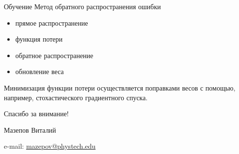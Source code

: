 \documentclass[unicode,aspectratio=43]{beamer}
\newcommand{\colorhref}[2]{\href{#1}{\textcolor{miptbase!30!black}{#2}}}
\begin{document}
\begin{frame}{Обучение}
	Метод обратного распространения ошибки
	\begin{itemize}
		\item прямое распространение
		\item функция потери
		\item обратное распространение
		\item обновление веса
	\end{itemize}
	
	Минимизация функции потери осуществляется поправками весов с помощью, например, стохастического градиентного спуска. 
\end{frame}


\begin{frame}[plain]
  \begin{center}
  {\Huge Спасибо за внимание!}
  \vspace{8ex}

  Мазепов Виталий

  e-mail: \colorhref{mailto:mazepov@phystech.edu}{mazepov@phystech.edu}
  \end{center}
\end{frame}
\end{document}
